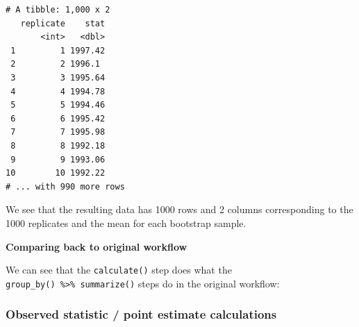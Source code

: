 \documentclass[12pt, krantz2,]{krantz}
\makeatletter
\newenvironment{Shaded}{\begin{snugshade}}{\end{snugshade}}
\newcommand{\CommentTok}[1]{\textcolor[rgb]{0.37,0.37,0.37}{\textit{#1}}}
\newcommand{\DataTypeTok}[1]{\textcolor[rgb]{0.27,0.27,0.27}{#1}}
\newcommand{\DecValTok}[1]{\textcolor[rgb]{0.06,0.06,0.06}{#1}}
\newcommand{\KeywordTok}[1]{\textcolor[rgb]{0.27,0.27,0.27}{\textbf{#1}}}
\newcommand{\NormalTok}[1]{#1}
\newcommand{\OperatorTok}[1]{\textcolor[rgb]{0.43,0.43,0.43}{\textbf{#1}}}
\newcommand{\OtherTok}[1]{\textcolor[rgb]{0.37,0.37,0.37}{#1}}
\newcommand{\StringTok}[1]{\textcolor[rgb]{0.5,0.5,0.5}{#1}}
\newenvironment{kframe}{%
\medskip{}
\setlength{\fboxsep}{.8em}
 \def\at@end@of@kframe{}%
 \ifinner\ifhmode%
  \def\at@end@of@kframe{\end{minipage}}%
  \begin{minipage}{\columnwidth}%
 \fi\fi%
 \def\FrameCommand##1{\hskip\@totalleftmargin \hskip-\fboxsep
 \colorbox{shadecolor}{##1}\hskip-\fboxsep
     \hskip-\linewidth \hskip-\@totalleftmargin \hskip\columnwidth}%
 \MakeFramed {\advance\hsize-\width
   \@totalleftmargin\z@ \linewidth\hsize
   \@setminipage}}%
 {\par\unskip\endMakeFramed%
 \at@end@of@kframe}
\renewenvironment{Shaded}{\begin{kframe}}{\end{kframe}}
\makeatother
\begin{document}
\begin{verbatim}
# A tibble: 1,000 x 2
   replicate    stat
       <int>   <dbl>
 1         1 1997.42
 2         2 1996.1 
 3         3 1995.64
 4         4 1994.78
 5         5 1994.46
 6         6 1995.42
 7         7 1995.98
 8         8 1992.18
 9         9 1993.06
10        10 1992.22
# ... with 990 more rows
\end{verbatim}

We see that the resulting data has 1000 rows and 2 columns corresponding to the 1000 replicates and the mean for each bootstrap sample.

\textbf{Comparing back to original workflow}

We can see that the \texttt{calculate()} step does what the \texttt{group\_by()\ \%\textgreater{}\%\ summarize()} steps do in the original workflow:

\begin{Shaded}
\end{Shaded}

\hypertarget{observed-statistic-point-estimate-calculations}{%
\subsubsection*{Observed statistic / point estimate calculations}\label{observed-statistic-point-estimate-calculations}}
\end{document}
